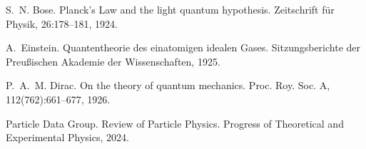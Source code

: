 \documentclass[11pt,a4paper,twoside]{article}
\numberwithin{equation}{section}
\theoremstyle{customthm}
\theoremstyle{customdef}
\theoremstyle{customrem}
\begin{document}
\begin{thebibliography}{99}
S.~N. Bose. Planck’s Law and the light quantum hypothesis. Zeitschrift für Physik, 26:178–181, 1924.

A.~Einstein. Quantentheorie des einatomigen idealen Gases. Sitzungsberichte der Preußischen Akademie der Wissenschaften, 1925.

P.~A.~M. Dirac. On the theory of quantum mechanics. Proc. Roy. Soc. A, 112(762):661–677, 1926.

Particle Data Group. Review of Particle Physics. Progress of Theoretical and Experimental Physics, 2024.

\end{thebibliography}
\end{document}
